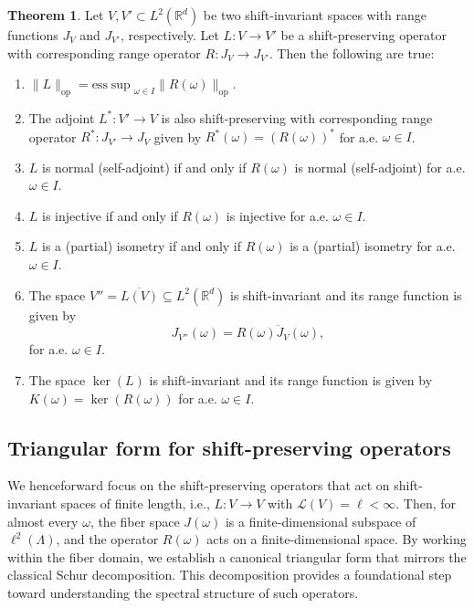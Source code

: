 \documentclass[a4paper,11pt]{amsart}
\theoremstyle{definition}
\newtheorem{teo}[fed]{Theorem}
\theoremstyle{definition}
\def\La{\Lambda}
\def\w{\omega}
\def\R{\mathbb{R}}
\def\ele{\mathcal{L}}
\newcommand{\esssup}{{\mathrm{ess}\sup}}
\begin{document}
	\begin{teo}\label{thm:pointwise}
		Let $V,V'\subset L^2(\R^d)$ be two shift-invariant spaces with range functions $J_V$ and $J_{V'}$, respectively. Let $L:V\rightarrow V'$ be a shift-preserving operator with corresponding range operator $R: J_V\rightarrow J_{V'}$. Then the following are true:
		\begin{enumerate}
			\item[i)]\label{op-norm} $\|L\|_{\text{op}}=\esssup_{\w\in I} \|R(\w)\|_{\text{op}}$. 
			\item[ii)] The adjoint $L^*:V'\rightarrow V$ is also shift-preserving with corresponding range operator $R^*:J_{V'}\rightarrow J_V$ given by $R^*(\w)=(R(\w))^*$ for a.e. $\w\in I$.
			\item[iii)] $L$ is normal (self-adjoint) if and only if $R(\w)$ is normal (self-adjoint) for a.e. $\w\in I$.
			\item[iv)] $L$ is injective if and only if $R(\w)$ is injective for a.e. $\w\in  I$.
			\item[v)]\label{partial-isom} $L$ is a (partial) isometry if and only if $R(\w)$ is a (partial) isometry for a.e. $\w\in I$.
			\item[vi)]\label{rank} The space $V''=\overline{L(V)}\subseteq L^2(\R^d)$ is shift-invariant and its range function is given by $$J_{V''}(\w)=\overline{R(\w) J_V(\w)},$$
			for a.e. $\w\in I$.
			\item[vii)]\label{ker} The space $\ker(L)$ is shift-invariant and its range function is given by $K(\w)=\ker(R(\w))$ for a.e. $\w\in I$.
		\end{enumerate}
	\end{teo} 
	
	
	\subsection{Triangular form for shift-preserving operators}
	
	We henceforward focus on the shift-preserving operators that act on shift-invariant spaces of finite length, i.e., $L:V\to V$ with $\ele(V) =\ell < \infty$. Then, for almost every $\w$, the fiber space $J(\w)$ is a finite-dimensional subspace of $\ell^2(\La)$, and the operator $R(\w)$ acts on a finite-dimensional space.
	By working within the fiber domain, we establish a canonical triangular form that mirrors the classical Schur decomposition. This decomposition provides a foundational step toward understanding the spectral structure of such operators.
	
\end{document}
